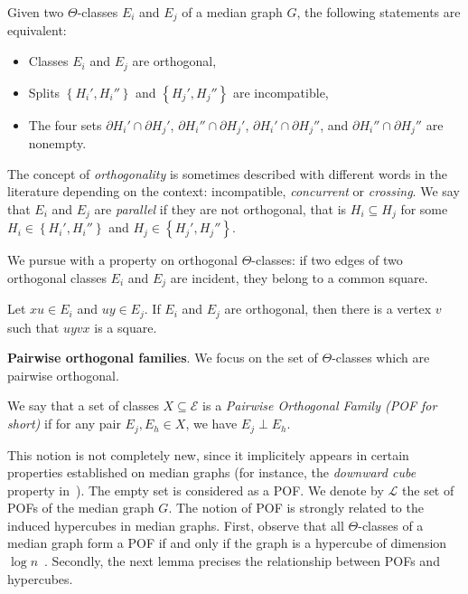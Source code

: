 \documentclass[a4paper,UKenglish,numberwithinsect,cleveref, autoref]{lipics-v2021}
\newcommand{\set}[1]{\left\{ #1 \right\}}
\begin{document}
\begin{lemma} Given two $\Theta$-classes $E_i$ and $E_j$ of a median graph $G$, the following statements are equivalent:
\begin{itemize}
    \item Classes $E_i$ and $E_j$ are orthogonal,
    \item Splits $\set{H_i',H_i''}$ and $\set{H_j',H_j''}$ are incompatible,
    \item The four sets $\partial H_i' \cap \partial H_j'$, $\partial H_i'' \cap \partial H_j'$, $\partial H_i' \cap \partial H_j''$, and $\partial H_i'' \cap \partial H_j''$ are nonempty.
\end{itemize}
\label{le:perp_incomp}
\end{lemma}

The concept of \textit{orthogonality} is sometimes described with different words in the literature depending on the context: incompatible, \textit{concurrent} or \textit{crossing}. We say that $E_i$ and $E_j$ are \textit{parallel} if they are not orthogonal, that is $H_i \subseteq H_j$ for some $H_i \in \set{H_i',H_i''}$ and $H_j \in \set{H_j',H_j''}$. 

We pursue with a property on orthogonal $\Theta$-classes: if two edges of two orthogonal classes $E_i$ and $E_j$ are incident, they belong to a common square.

\begin{lemma}
Let $xu \in E_i$ and $uy \in E_j$. If $E_i$ and $E_j$ are orthogonal, then there is a vertex $v$ such that $uyvx$ is a square.
\label{le:squares}
\end{lemma}

\textbf{Pairwise orthogonal families}. We focus on the set of $\Theta$-classes which are pairwise orthogonal.

\begin{definition}
We say that a set of classes $X \subseteq \mathcal{E}$ is a {\em Pairwise Orthogonal Family (POF for short)} if for any pair $E_j,E_h \in X$, we have $E_j \perp E_h$.
\end{definition}

This notion is not completely new, since it implicitely appears in certain properties established on median graphs (for instance, the \textit{downward cube} property in~\cite{BeChChVa20}). The empty set is considered as a POF. We denote by $\mathcal{L}$ the set of POFs of the median graph $G$. The notion of POF is strongly related to the induced hypercubes in median graphs. First, observe that all $\Theta$-classes of a median graph form a POF if and only if the graph is a hypercube of dimension $\log n$~\cite{Ko09,MoMuRo98}. Secondly, the next lemma precises the relationship  between POFs and hypercubes.
\end{document}
